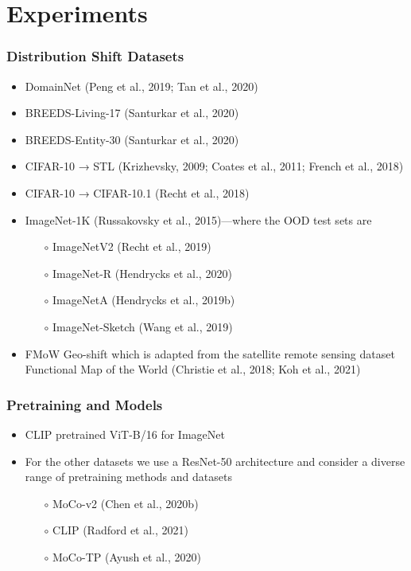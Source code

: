 \documentclass[16pt,aspectratio=169]{beamer}
\begin{document}
\section{Experiments}

\begin{frame}
    \frametitle{Distribution Shift Datasets}

    \begin{itemize}
        \item DomainNet (Peng et al., 2019; Tan et al., 2020)
        \item BREEDS-Living-17 (Santurkar et al., 2020)
        \item BREEDS-Entity-30 (Santurkar et al., 2020)
        \item CIFAR-10 → STL (Krizhevsky, 2009; Coates et al., 2011; French et al., 2018)
        \item CIFAR-10 → CIFAR-10.1 (Recht et al., 2018)
        \item ImageNet-1K (Russakovsky et al., 2015)—where the OOD test sets are 
        \begin{itemize}
            \item[$\circ$] ImageNetV2 (Recht et al., 2019)
            \item[$\circ$] ImageNet-R (Hendrycks et al., 2020)
            \item[$\circ$] ImageNetA (Hendrycks et al., 2019b)
            \item[$\circ$] ImageNet-Sketch (Wang et al., 2019)
        \end{itemize}
        \item FMoW Geo-shift which is adapted from the satellite remote sensing dataset Functional Map of the World (Christie et al., 2018; Koh et al., 2021)
    \end{itemize}
    
\end{frame}

\begin{frame}
    \frametitle{Pretraining and Models}

    \begin{itemize}
        \item CLIP pretrained ViT-B/16 for ImageNet
        \item For the other datasets we use a ResNet-50 architecture and consider a diverse range of pretraining methods and datasets
        \begin{itemize}
            \item[$\circ$] MoCo-v2 (Chen et al., 2020b)
            \item[$\circ$] CLIP (Radford et al., 2021)
            \item[$\circ$] MoCo-TP (Ayush et al., 2020)
        \end{itemize}
    \end{itemize}

\end{frame}
\end{document}
